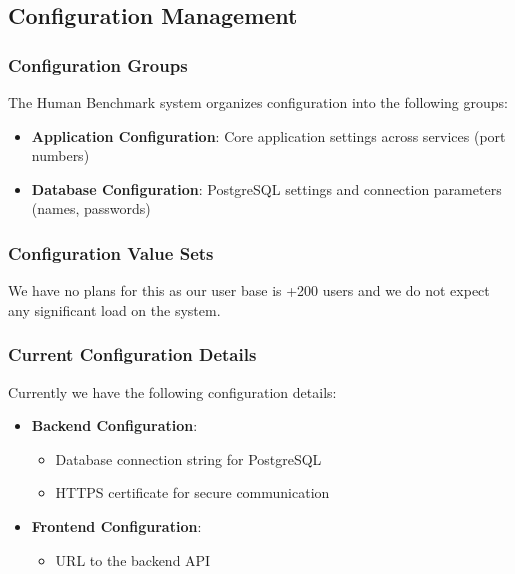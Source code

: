 \subsection{Configuration Management}

\subsubsection{Configuration Groups}

The Human Benchmark system organizes configuration into the following groups:

\begin{itemize}
    \item \textbf{Application Configuration}: Core application settings across services (port numbers)
    \item \textbf{Database Configuration}: PostgreSQL settings and connection parameters (names, passwords)
\end{itemize}

\subsubsection{Configuration Value Sets}
We have no plans for this as our user base is +200 users and we do not expect
any significant load on the system.


\subsubsection{Current Configuration Details}

Currently we have the following configuration details:

\begin{itemize}
    \item \textbf{Backend Configuration}:
          \begin{itemize}
              \item Database connection string for PostgreSQL
              \item HTTPS certificate for secure communication
          \end{itemize}
    \item \textbf{Frontend Configuration}:
          \begin{itemize}
              \item URL to the backend API
          \end{itemize}
\end{itemize}

